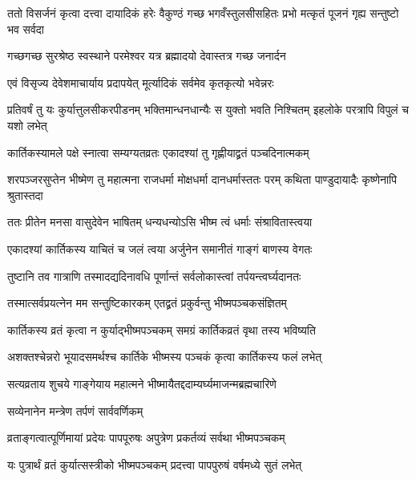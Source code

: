 \threelineshloka
{ततो विसर्जनं कृत्वा दत्त्वा दायादिकं हरेः}
{वैकुण्ठं गच्छ भगवँस्तुलसीसहितः प्रभो}
{मत्कृतं पूजनं गृह्य सन्तुष्टो भव सर्वदा} %

\twolineshloka
{गच्छगच्छ सुरश्रेष्ठ स्वस्थाने परमेश्वर}
{यत्र ब्रह्मादयो देवास्तत्र गच्छ जनार्दन} %

\twolineshloka
{एवं विसृज्य देवेशमाचार्याय प्रदापयेत्}
{मूर्त्यादिकं सर्वमेव कृतकृत्यो भवेन्नरः} %

\threelineshloka
{प्रतिवर्षं तु यः कुर्यात्तुलसीकरपीडनम्}
{भक्तिमान्धनधान्यैः स युक्तो भवति निश्चितम्}
{इहलोके परत्रापि विपुलं च यशो लभेत्} %





\twolineshloka
{कार्तिकस्यामले पक्षे स्नात्वा सम्यग्यतव्रतः}
{एकादश्यां तु गृह्णीयाद्व्रतं पञ्चदिनात्मकम्} %

\threelineshloka
{शरपञ्जरसुप्तेन भीष्मेण तु महात्मना}
{राजधर्मा मोक्षधर्मा दानधर्मास्ततः परम्}
{कथिता पाण्डुदायादैः कृष्णेनापि श्रुतास्तदा} %

\twolineshloka
{ततः प्रीतेन मनसा वासुदेवेन भाषितम्}
{धन्यधन्योऽसि भीष्म त्वं धर्माः संश्रावितास्त्वया} %

\twolineshloka
{एकादश्यां कार्तिकस्य याचितं च जलं त्वया}
{अर्जुनेन समानीतं गाङ्गं बाणस्य वेगतः} %

\twolineshloka
{तुष्टानि तव गात्राणि तस्मादद्यदिनावधि}
{पूर्णान्तं सर्वलोकास्त्वां तर्पयन्त्वर्घ्यदानतः} %

\twolineshloka
{तस्मात्सर्वप्रयत्नेन मम सन्तुष्टिकारकम्}
{एतद्व्रतं प्रकुर्वन्तु भीष्मपञ्चकसंज्ञितम्} %

\twolineshloka
{कार्तिकस्य व्रतं कृत्वा न कुर्याद्भीष्मपञ्चकम्}
{समग्रं कार्तिकव्रतं वृथा तस्य भविष्यति} %

\twolineshloka
{अशक्तश्चेन्नरो भूयादसमर्थश्च कार्तिके}
{भीष्मस्य पञ्चकं कृत्वा कार्तिकस्य फलं लभेत्} %

\twolineshloka
{सत्यव्रताय शुचये गाङ्गेयाय महात्मने}
{भीष्मायैतद्ददाम्यर्घ्यमाजन्मब्रह्मचारिणे} %


\onelineshloka
{सव्येनानेन मन्त्रेण तर्पणं सार्ववर्णिकम्} %

\twolineshloka
{व्रताङ्गत्वात्पूर्णिमायां प्रदेयः पापपूरुषः}
{अपुत्रेण प्रकर्तव्यं सर्वथा भीष्मपञ्चकम्} %

\twolineshloka
{यः पुत्रार्थं व्रतं कुर्यात्सस्त्रीको भीष्मपञ्चकम्}
{प्रदत्त्वा पापपुरुषं वर्षमध्ये सुतं लभेत्} %


